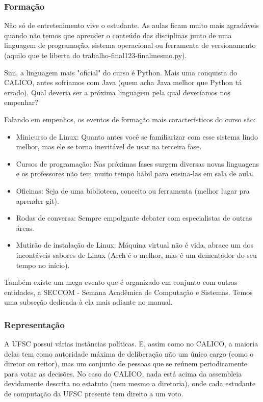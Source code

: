 \subsubsection{Formação}

Não só de entretenimento vive o estudante. As aulas ficam muito mais agradáveis quando não temos que aprender o conteúdo das disciplinas junto de uma linguagem de programação, sistema operacional ou ferramenta de versionamento (aquilo que te liberta do trabalho-final123-finalmesmo.py).

Sim, a linguagem mais "oficial" do curso é Python. Mais uma conquista do CALICO, antes sofriamos com Java (quem acha Java melhor que Python tá errado). Qual deveria ser a próxima linguagem pela qual deveríamos nos empenhar?

Falando em empenhos, os eventos de formação mais característicos do curso são:
\begin{itemize}
    \item Minicurso de Linux: Quanto antes você se familiarizar com esse sistema lindo melhor, mas ele se torna inevitável de usar na terceira fase.
    \item Cursos de programação: Nas próximas fases surgem diversas novas linguagens e os professores não tem muito tempo hábil para ensina-las em sala de aula.
    \item Oficinas: Seja de uma biblioteca, conceito ou ferramenta (melhor lugar pra aprender git).
    \item Rodas de conversa: Sempre empolgante debater com especialistas de outras áreas.
    \item Mutirão de instalação de Linux: Máquina virtual não é vida, abrace um dos incontáveis sabores de Linux (Arch é o melhor, mas é um dementador do seu tempo no início).
\end{itemize}

Também existe um mega evento que é organizado em conjunto com outras entidades, a SECCOM - Semana Acadêmica de Computação e Sistemas. Temos uma subseção dedicada à ela mais adiante no manual.

\subsubsection{Representação}

A UFSC possui várias instâncias políticas. E, assim como no CALICO, a maioria delas tem como autoridade máxima de deliberação não um único cargo (como o diretor ou reitor), mas um conjunto de pessoas que se reúnem periodicamente para votar as decisões. No caso do CALICO, nada está acima da assembleia devidamente descrita no estatuto (nem mesmo a diretoria), onde cada estudante de computação da UFSC presente tem direito a um voto.

